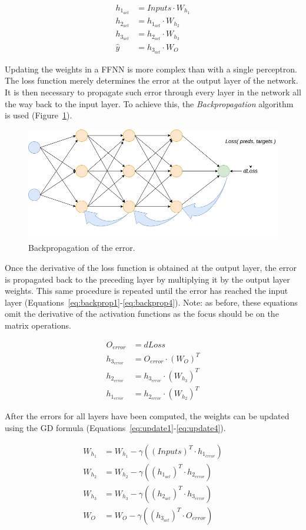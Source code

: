 \begin{align}
    h_{1_{act}} &= Inputs \cdot W_{h_1} \label{eq:forward1}\\
    h_{2_{act}} &= h_{1_{act}} \cdot W_{h_2} \label{eq:forward2}\\
    h_{3_{act}} &= h_{2_{act}} \cdot W_{h_3} \label{eq:forward3}\\
    \hat{y} &= h_{3_{act}} \cdot W_{O}
    \label{eq:forward4}
\end{align}

Updating the weights in a FFNN is more complex than with a single perceptron. The loss function merely determines the error at the output layer of the network. It is then necessary to propagate such error through every layer in the network all the way back to the input layer. To achieve this, the \textit{Backpropagation} algorithm is used (Figure~\ref{fig:backprop}).

\begin{figure}[!htbp]
    \centering
    \includegraphics[width=.5\textwidth]{Images/backprop.png}
    \caption{Backpropagation of the error.}
    \label{fig:backprop}
\end{figure}

Once the derivative of the loss function is obtained at the output layer, the error is propagated back to the preceding layer by multiplying it by the output layer weights. This same procedure is repeated until the error has reached the input layer (Equations~\ref{eq:backprop1}-\ref{eq:backprop4}). Note: as before, these equations omit the derivative of the activation functions as the focus should be on the matrix operations. 

\begin{align}
        O_{error} &= dLoss \label{eq:backprop1}\\
        h_{3_{error}} &= O_{error} \cdot (W_{O})^T \label{eq:backprop2}\\
        h_{2_{error}} &= h_{3_{error}} \cdot (W_{h_3})^T \label{eq:backprop3}\\
        h_{1_{error}} &= h_{2_{error}} \cdot (W_{h_2})^T \label{eq:backprop4}
\end{align}

After the errors for all layers have been computed, the weights can be updated using the GD formula (Equations~\ref{eq:update1}-\ref{eq:update4}).

\begin{align}
    W_{h_1} &= W_{h_1} - \gamma ((Inputs)^T \cdot h_{1_{error}}) \label{eq:update1} \\
    W_{h_2} &= W_{h_2} - \gamma ((h_{1_{act}})^T \cdot h_{2_{error}}) \label{eq:update2} \\
    W_{h_3} &= W_{h_3} - \gamma ((h_{2_{act}})^T \cdot h_{3_{error}}) \label{eq:update3} \\
    W_{O} &= W_{O} - \gamma ((h_{3_{act}})^T \cdot O_{error}) \label{eq:update4}
\end{align}

